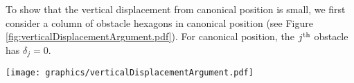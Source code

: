 


To show that the vertical displacement from canonical position is small, we first consider a column of obstacle hexagons in canonical position (see Figure \ref{fig:verticalDisplacementArgument.pdf}).  
For canonical position, the $j^\text{th}$ obstacle has $\delta_j = 0$.

\begin{minipage}{\linewidth}
\begin{center}
\texttt{[image: graphics/verticalDisplacementArgument.pdf]}
\label{fig:verticalDisplacementArgument.pdf}
\end{center}
\end{minipage}

